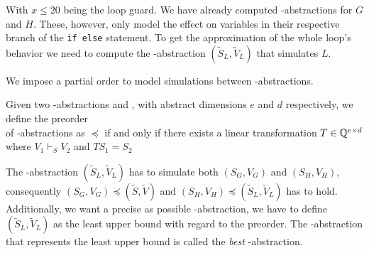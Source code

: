 With $x \leq 20$ being the loop guard. We have already computed \qvasr-abstractions for $G$ and $H$. These, however, only model the effect on variables in their respective branch of the \texttt{if else} statement. To get the approximation of the whole loop's behavior we need to compute the \qvasr-abstraction $(\tilde{S}_L, \tilde{V}_L)$ that simulates $L$. \\ \par We impose a partial order to model simulations between \qvasr-abstractions.
\begin{mydef}
	Given two \qvasr-abstractions   and , with abstract dimensions $e$ and $d$ respectively, we define the preorder \\ of \qvasr-abstractions as  $\preceq$  if and only if there exists a linear transformation $T \in  \mathbb{Q} ^{e \times d}$ where $V_1 \vdash_S V_2$ and $TS_1 = S_2$
\end{mydef}
The \qvasr-abstraction $(\tilde{S}_L, \tilde{V}_L)$ has to simulate both $(S_G, V_G)$ and $(S_H, V_H)$, consequently $(S_G, V_G) \preceq (\tilde{S}, \tilde{V})$ and $(S_H, V_H) \preceq (\tilde{S}_L, \tilde{V}_L)$ has to hold. Additionally, we want a precise as possible \qvasr-abstraction, we have to define $(\tilde{S}_L, \tilde{V}_L)$ as the least upper bound with regard to the preorder. The \qvasr-abstraction that represents the least upper bound is called the \textsl{best} \qvasr-abstraction. \\ \par

